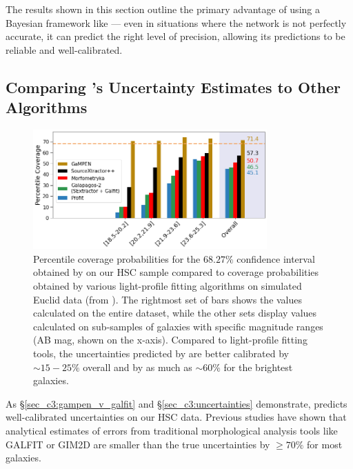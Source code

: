 The results shown in this section outline the primary advantage of using a Bayesian framework like \gampen{}--- even in situations where the network is not perfectly accurate, it can predict the right level of precision, allowing its predictions to be reliable and well-calibrated.

\subsection{Comparing \gampen{}'s Uncertainty Estimates to Other Algorithms}
\label{sec_c3:uncer_comp}

\begin{figure}[htb]
    \centering
    \includegraphics[width = 0.8\textwidth]{cov_prob_euclud_comp.png}
    \caption{Percentile coverage probabilities for the $68.27\%$ confidence interval obtained by \gampen{} on our HSC sample compared to coverage probabilities obtained by various light-profile fitting algorithms on simulated Euclid data %
    (from \citealp{euclid_morph}). The rightmost set of bars shows the values calculated on the entire dataset, while the other sets display values calculated on sub-samples of galaxies with specific magnitude ranges (AB mag, shown on the x-axis). %
    Compared to light-profile fitting tools, the uncertainties predicted by \gampen{} are better calibrated by $\sim15-25\%$ overall and by as much as $\sim60\%$ for the brightest galaxies.}
    \label{fig_c3:cov_prob_comp_euclud}
\end{figure}

As \S \ref{sec_c3:gampen_v_galfit} and \S\ref{sec_c3:uncertainties} demonstrate, \gampen{} predicts well-calibrated uncertainties on our HSC data. Previous studies \citep[e.g.,][]{haussler_07} have shown that analytical estimates of errors from traditional morphological analysis tools like GALFIT or GIM2D \citep{gim2d} are smaller than the true uncertainties by $\geq70\%$ for most galaxies.

